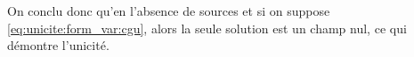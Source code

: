   On conclu donc qu'en l'absence de sources et si on suppose \eqref{eq:unicite:form_var:cgu}, alors la seule solution est un champ nul, ce qui démontre l'unicité.




